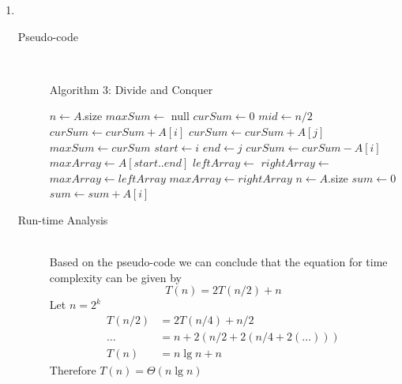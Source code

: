 \documentclass[paper=a4, fontsize=11pt]{scrartcl} %
\numberwithin{equation}{section} %
\numberwithin{figure}{section} %
\numberwithin{table}{section} %
\begin{document}
\begin{enumerate}[label=\bfseries Algorithm \arabic*:]
    \item \hfill \\
    \begin{description}
        \item[Pseudo-code] \hfill \\
        \begin{algorithmc}
            \caption{Algorithm 3: Divide and Conquer}
                \State $n \gets A$.size
                \State $maxSum \gets$ null
                \State $curSum \gets 0$
                \State $mid \gets n / 2$
                    $curSum \gets curSum + A[i]$
                \EndFor
                        \State $curSum \gets curSum + A[j]$
                            \State $maxSum \gets curSum$
                            \State $start \gets i$
                            \State $end \gets j$
                        \EndIf
                    \EndFor
                    \State $curSum \gets curSum - A[i]$
                \EndFor
                \State $maxArray \gets A[start..end]$
                \State $leftArray \gets$ 
                \State $rightArray \gets$ 
                    \State $maxArray \gets leftArray$
                \EndIf
                    \State $maxArray \gets rightArray$
                \EndIf
                \State {}
            \EndFunction
                \State $n \gets A$.size
                \State $sum \gets 0$
                    \State $sum \gets sum + A[i]$
                \EndFor
                \State {}
            \EndFunction
        \end{algorithmc}
        \item[Run-time Analysis] \hfill \\
        Based on the pseudo-code we can conclude that the equation for 
        time complexity can be given by
        \[ T(n) = 2T(n/2) + n \]
        Let $n = 2^k$
        \begin{align*}
            T(n/2) & = 2T(n/4) + n/2 \\
            \ldots & = n + 2(n/2 + 2(n/4 + 2(\ldots))) \\
            T(n) & = n\lg{n} + n
        \end{align*}
        Therefore $T(n) = \Theta(n\lg{n})$
    \end{description}


\end{enumerate}
\end{document}
